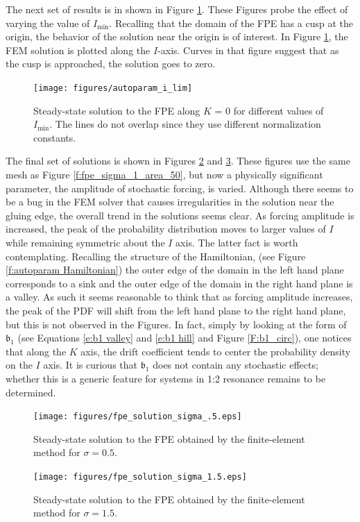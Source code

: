 The next set of results is in shown in Figure \ref{f:fpe_sigma_1_i_lim}. These Figures probe the effect of varying the value of $I_\text{min}$. Recalling that the domain of the FPE has a cusp at the origin, the behavior of the solution near the origin is of interest. In Figure \ref{f:fpe_sigma_1_i_lim}, the FEM solution is plotted along the $I$-axis. Curves in that figure suggest that as the cusp is approached, the solution goes to zero.

\begin{figure}
\begin{center}
\texttt{[image: figures/autoparam\_i\_lim]}
\caption{Steady-state solution to the FPE along $K$ = 0 for different values of $I_\text{min}$. The lines do not overlap since they use different normalization constants.}
\label{f:fpe_sigma_1_i_lim}
\end{center}
\end{figure}

The final set of solutions is shown in Figures \ref{f:fpe_sigma_.5} and \ref{f:fpe_sigma_1.5}. These figures use the same mesh as Figure \ref{f:fpe_sigma_1_area_50}, but now a physically significant parameter, the amplitude of stochastic forcing, is varied. Although there seems to be a bug in the FEM solver that causes irregularities in the solution near the gluing edge, the overall trend in the solutions seems clear. As forcing amplitude is increased, the peak of the probability distribution moves to larger values of $I$ while remaining symmetric about the $I$ axis. The latter fact is worth contemplating. Recalling the structure of the Hamiltonian, (see Figure \ref{f:autoparam Hamiltonian}) the outer edge of the domain in the left hand plane corresponds to a sink and the outer edge of the domain in the right hand plane is a valley. As such it seems reasonable to think that as forcing amplitude increases, the peak of the PDF will shift from the left hand plane to the right hand plane, but this is not observed in the Figures. In fact, simply by looking at the form of $\mathfrak b_1$ (see Equations \eqref{e:b1 valley} and \eqref{e:b1 hill} and Figure \ref{F:b1_circ}), one notices that along the $K$ axis, the drift coefficient tends to center the probability density on the $I$ axis. It is curious that $\mathfrak b_1$ does not contain any stochastic effects; whether this is a generic feature for systems in 1:2 resonance remains to be determined.

\begin{figure}
\begin{center}
\texttt{[image: figures/fpe\_solution\_sigma\_.5.eps]}
\caption{Steady-state solution to the FPE obtained by the finite-element method for $\sigma = 0.5$.}
\label{f:fpe_sigma_.5}
\end{center}
\end{figure}

\begin{figure}
\begin{center}
\texttt{[image: figures/fpe\_solution\_sigma\_1.5.eps]}
\caption{Steady-state solution to the FPE obtained by the finite-element method for $\sigma = 1.5$.}
\label{f:fpe_sigma_1.5}
\end{center}
\end{figure}
